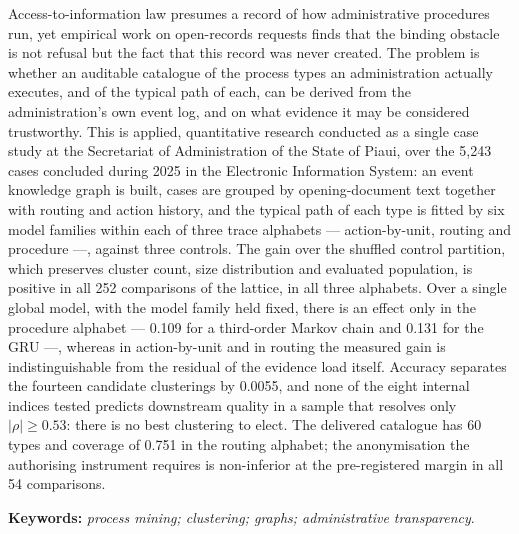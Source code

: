 \noindent Access-to-information law presumes a record of how administrative procedures run, yet
empirical work on open-records requests finds that the binding obstacle is not refusal but the fact
that this record was never created. The problem is whether an auditable catalogue of the process
types an administration actually executes, and of the typical path of each, can be derived from the
administration's own event log, and on what evidence it may be considered trustworthy. This is
applied, quantitative research conducted as a single case study at the Secretariat of
Administration of the State of Piaui, over the 5,243 cases concluded during 2025 in the Electronic
Information System: an event knowledge graph is built, cases are grouped by opening-document text
together with routing and action history, and the typical path of each type is fitted by six model
families within each of three trace alphabets --- action-by-unit, routing and procedure ---,
against three controls. The gain over the shuffled control partition, which preserves cluster
count, size distribution and evaluated population, is positive in all 252 comparisons of the
lattice, in all three alphabets. Over a single global model, with the model family held fixed,
there is an effect only in the procedure alphabet --- 0.109 for a third-order Markov chain and
0.131 for the GRU ---, whereas in action-by-unit and in routing the measured gain is
indistinguishable from the residual of the evidence load itself. Accuracy separates the fourteen
candidate clusterings by 0.0055, and none of the eight internal indices tested predicts downstream
quality in a sample that resolves only $|\rho| \geq 0.53$: there is no best clustering to elect.
The delivered catalogue has 60 types and coverage of 0.751 in the routing alphabet; the
anonymisation the authorising instrument requires is non-inferior at the pre-registered margin in
all 54 comparisons.

\vspace{0.6\baselineskip}
\noindent\textbf{Keywords:} \textit{process mining; clustering; graphs;
administrative transparency}.

\newpage
